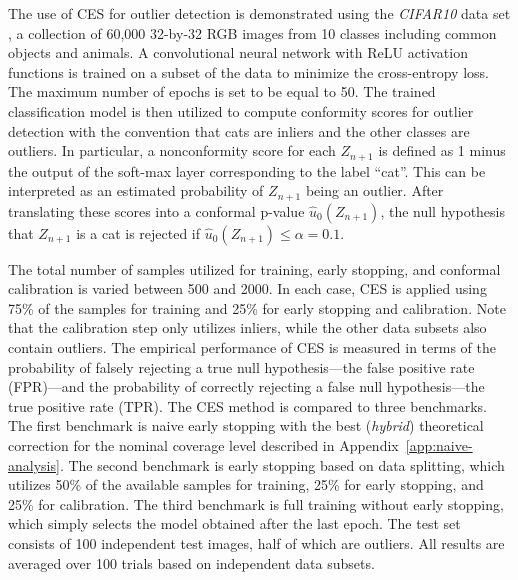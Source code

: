 The use of CES for outlier detection is demonstrated using the {\em CIFAR10} data set \cite{cifar10}, a collection of 60,000 32-by-32 RGB images from 10 classes including common objects and animals.
A convolutional neural network with ReLU activation functions is trained on a subset of the data to minimize the cross-entropy loss. The maximum number of epochs is set to be equal to 50.
The trained classification model is then utilized to compute conformity scores for outlier detection with the convention that cats are inliers and the other classes are outliers.
In particular, a nonconformity score for each $Z_{n+1}$ is defined as 1 minus the output of the soft-max layer corresponding to the label ``cat''.
This can be interpreted as an estimated probability of $Z_{n+1}$ being an outlier.
After translating these scores into a conformal p-value $\hat{u}_0(Z_{n+1})$, the null hypothesis that $Z_{n+1}$ is a cat is rejected if $\hat{u}_0(Z_{n+1}) \leq \alpha = 0.1$.

The total number of samples utilized for training, early stopping, and conformal calibration is varied between 500 and 2000.
In each case, CES is applied using 75\% of the samples for training and 25\% for early stopping and calibration. Note that the calibration step only utilizes inliers, while the other data subsets also contain outliers.
The empirical performance of CES is measured in terms of the probability of falsely rejecting a true null hypothesis---the false positive rate (FPR)---and the probability of correctly rejecting a false null hypothesis---the true positive rate (TPR).
The CES method is compared to three benchmarks. The first benchmark is naive early stopping with the best ({\em hybrid}) theoretical correction for the nominal coverage level described in Appendix~\ref{app:naive-analysis}. The second benchmark is early stopping based on data splitting, which utilizes 50\% of the available samples for training, 25\% for early stopping, and 25\% for calibration.
The third benchmark is full training without early stopping, which simply selects the model obtained after the last epoch.
The test set consists of 100 independent test images, half of which are outliers.
All results are averaged over 100 trials based on independent data subsets.

